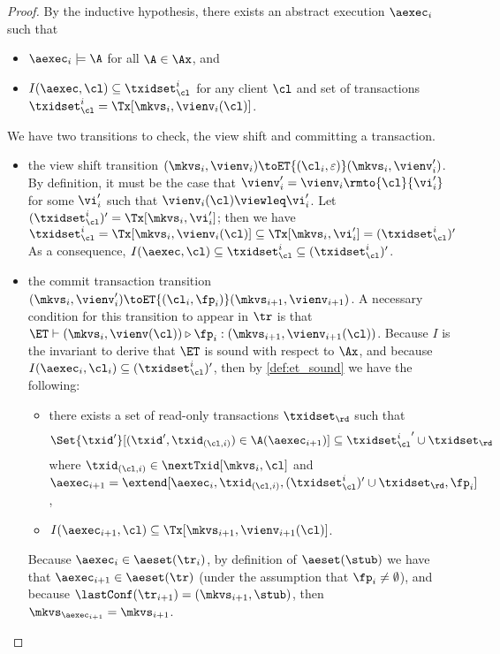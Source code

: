 \begin{proof}
By the inductive hypothesis, there exists an abstract execution $\aexec_i$ such that  
\begin{itemize}
\item $\aexec_{i} \models \A$ for all $\A \in \Ax$, and 
\item $I(\aexec, \cl) \subseteq \txidset_{\cl}^{i}$ for any client $\cl$ and set of transactions $\txidset_{\cl}^{i} = \Tx[\mkvs_{i}, \vienv_{i}(\cl)]$.
\end{itemize}

We have two transitions to check, the view shift and committing a transaction.
\begin{itemize}
\item the view shift transition $(\mkvs_{i}, \vienv_{i}) \toET{(\cl_{i}, \varepsilon)} (\mkvs_{i}, \vienv'_{i})$. 
By definition, it must be the case that $\vienv'_{i} = \vienv_{i}\rmto{\cl}{\vi'_{i}}$ 
for some $\vi'_{i}$ such that $\vienv_{i}(\cl) \viewleq \vi'_{i}$.
Let $(\txidset_{\cl}^{i})' = \Tx[\mkvs_{i}, \vi'_{i}]$; then we have 
\(
\txidset_{\cl}^{i} = \Tx[\mkvs_{i}, \vienv_{i}(\cl)] \subseteq \Tx[\mkvs_{i}, \vi'_{i}] = (\txidset_{\cl}^{i})' \)
As a consequence, $I(\aexec, \cl) \subseteq \txidset_{\cl}^{i} \subseteq (\txidset_{\cl}^{i})'$.

\item the commit transaction transition $(\mkvs_{i}, \vienv_{i}') \toET{(\cl_{i}, \fp_{i})}
(\mkvs_{i+1}, \vienv_{i+1})$.
A necessary condition for this transition 
to appear in $\tr$ is that $\ET \vdash (\mkvs_{i}, \vienv(\cl)) \triangleright \fp_{i}: (\mkvs_{i+1},\vienv_{i+1}(\cl))$. 
Because $I$ is the invariant to derive that $\ET$ is sound with respect to $\Ax$, 
and because $I(\aexec_{i}, \cl_{i}) \subseteq (\txidset^{i}_{\cl})'$, 
then by \cref{def:et_sound} we have the following:
\begin{itemize}
\item there exists a set of read-only transactions $\txidset_\rd$ 
such that 
\[
    \Set{\txid' }[ (\txid', \txid_{(\cl, i)}) \in \A(\aexec_{i+1})] \subseteq {\txidset^{i}_{\cl}}' \cup \txidset_\rd
\]
where 
$\txid_{(\cl, i)} \in \nextTxid[\mkvs_{i}, \cl]$
and $\aexec_{i+1} = \extend[\aexec_{i}, \txid_{(\cl, i)}, (\txidset^{i}_{\cl})' \cup \txidset_\rd, \fp_{i}]$,
\item  $I(\aexec_{i+1}, \cl) \subseteq \Tx[\mkvs_{i+1}, \vienv_{i+1}(\cl)]$.
\end{itemize} 
Because $\aexec_{i} \in \aeset(\tr_{i})$, by definition of $\aeset(\stub)$ we have that 
$\aexec_{i+1} \in \aeset(\tr)$ (under the assumption that $\fp_{i} \neq \emptyset$), 
and because $\lastConf(\tr_{i+1}) = (\mkvs_{i+1}, \stub)$, then $\mkvs_{\aexec_{i+1}} = \mkvs_{i+1}$. 


\end{itemize}
\end{proof}
